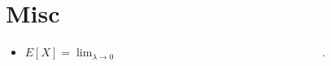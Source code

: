 \documentclass[12pt,reqno]{article}
\theoremstyle{plain}
\theoremstyle{definition}
\begin{document}
\section{Misc} 

\begin{itemize} 

\item $E[X] = \lim_{\lambda \rightarrow 0} \hspace{3in}$. 

\end{itemize} 
\end{document}
